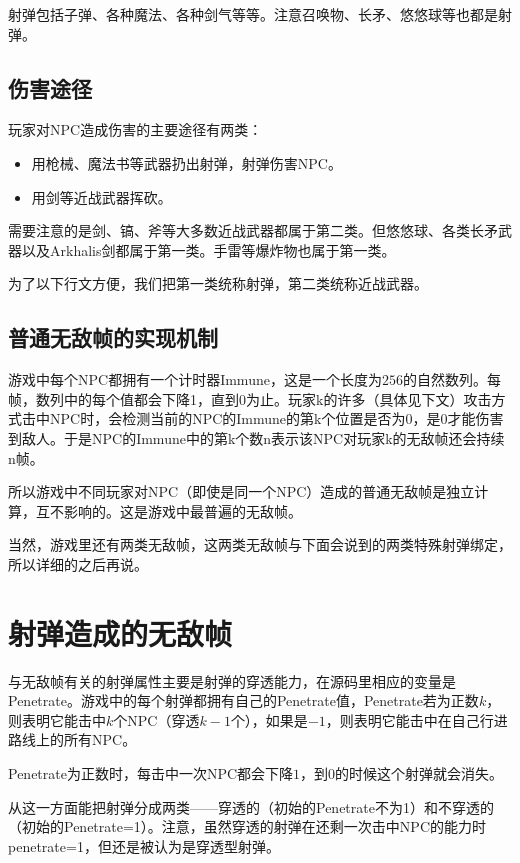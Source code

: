 射弹包括子弹、各种魔法、各种剑气等等。注意召唤物、长矛、悠悠球等也都是射弹。
\subsection{伤害途径}

玩家对NPC造成伤害的主要途径有两类：

\begin{itemize}
\item 用枪械、魔法书等武器扔出射弹，射弹伤害NPC。
\item 用剑等近战武器挥砍。
\end{itemize}

需要注意的是剑、镐、斧等大多数近战武器都属于第二类。但悠悠球、各类长矛武器以及Arkhalis剑都属于第一类。手雷等爆炸物也属于第一类。

为了以下行文方便，我们把第一类统称射弹，第二类统称近战武器。

\subsection{普通无敌帧的实现机制}

游戏中每个NPC都拥有一个计时器Immune，这是一个长度为$256$的自然数列。每帧，数列中的每个值都会下降1，直到0为止。玩家k的许多（具体见下文）攻击方式击中NPC时，会检测当前的NPC的Immune的第k个位置是否为$0$，是$0$才能伤害到敌人。于是NPC的Immune中的第k个数n表示该NPC对玩家k的无敌帧还会持续n帧。

所以游戏中不同玩家对NPC（即使是同一个NPC）造成的普通无敌帧是独立计算，互不影响的。这是游戏中最普遍的无敌帧。

当然，游戏里还有两类无敌帧，这两类无敌帧与下面会说到的两类特殊射弹绑定，所以详细的之后再说。

\section{射弹造成的无敌帧}

与无敌帧有关的射弹属性主要是射弹的穿透能力，在源码里相应的变量是Penetrate。游戏中的每个射弹都拥有自己的Penetrate值，Penetrate若为正数$k$，则表明它能击中$k$个NPC（穿透$k-1$个），如果是$-1$，则表明它能击中在自己行进路线上的所有NPC。

Penetrate为正数时，每击中一次NPC都会下降$1$，到$0$的时候这个射弹就会消失。

从这一方面能把射弹分成两类——穿透的（初始的Penetrate不为1）和不穿透的（初始的Penetrate=1）。注意，虽然穿透的射弹在还剩一次击中NPC的能力时penetrate=1，但还是被认为是穿透型射弹。

